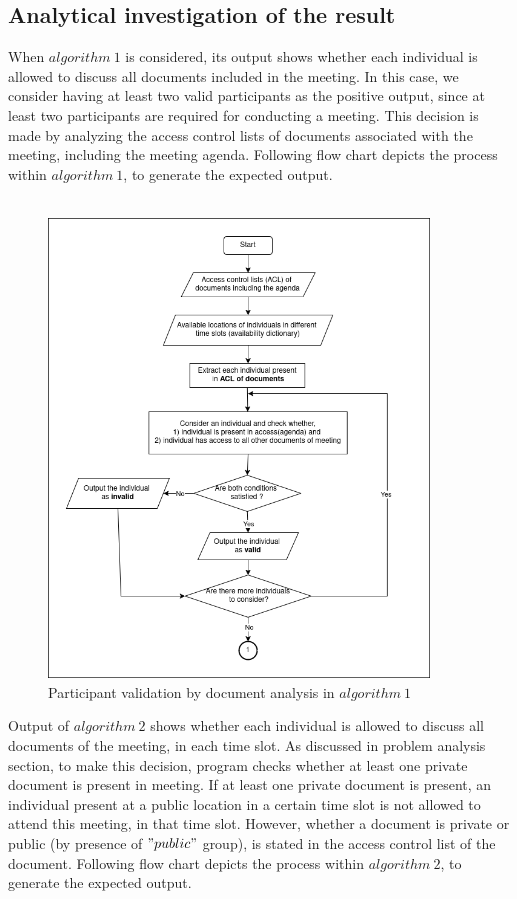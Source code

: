 \subsection{Analytical investigation of the result}
When $algorithm\ 1$ is considered, its output shows whether each individual is allowed to discuss all documents included in the meeting. In this case, we consider having at least two valid participants as the positive output, since at least two participants are required for conducting a meeting. This decision is made by analyzing the access control lists of documents associated with the meeting, including the meeting agenda. Following flow chart depicts the process within $algorithm\ 1$, to generate the expected output.\\ \\
\begin{figure}[H]
    \centering
    \includegraphics[width=0.9\textwidth]{./image/algo01_result_analysis.png}
    \caption{Participant validation by document analysis in $algorithm\ 1$}
    \label{fig:Participant validation by document analysis in algorithm 1}
\end{figure}
Output of $algorithm\ 2$ shows whether each individual is allowed to discuss all documents of the meeting, in each time slot. As discussed in problem analysis section, to make this decision, program checks whether at least one private document is present in meeting. If at least one private document is present, an individual present at a public location in a certain time slot is not allowed to attend this meeting, in that time slot. However, whether a document is private or public (by presence of $"public"$ group), is stated in the access control list of the document. Following flow chart depicts the process within $algorithm\ 2$, to generate the expected output.\\ \\
